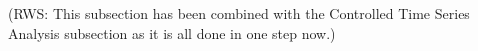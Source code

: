 \documentclass{ametsoc}
\begin{document}

(RWS: This subsection has been combined with the Controlled Time Series Analysis subsection as it is all done in one step now.)
\end{document}
